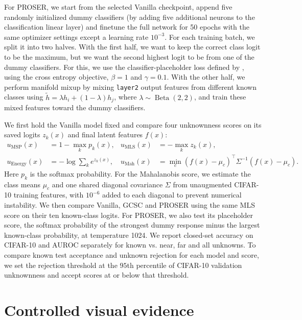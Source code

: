 \documentclass{article}
\begin{document}
For PROSER, we start from the selected Vanilla checkpoint, append five randomly initialized dummy classifiers (by adding five additional neurons to the classification linear layer) and finetune the full network for 50 epochs with the same optimizer settings except a learning rate $10^{-3}$. 
For each training batch, we split it into two halves. With the first half, we want to keep the correct class logit to be the maximum, but we want the second highest logit to be from one of the dummy classifiers. For this, we use the classifier-placeholder loss defined by \citet{zhou2021proser},
using the cross entropy objective, $\beta=1$ and $\gamma=0.1$.
With the other half, we perform manifold mixup by mixing \texttt{layer2} output features from different known classes using $\tilde h=\lambda h_i+(1-\lambda)h_j$, where $\lambda\sim\operatorname{Beta}(2,2)$, and train these mixed features toward the dummy classifiers.

We first hold the Vanilla model fixed and compare four unknownness scores on its saved logits $z_k(x)$ and final latent features $f(x)$:
\[
\begin{aligned}
u_{\mathrm{MSP}}(x)&=1-\max_k p_k(x), &
u_{\mathrm{MLS}}(x)&=-\max_k z_k(x),\\
u_{\mathrm{Energy}}(x)&=-\log\sum_k e^{z_k(x)}, &
u_{\mathrm{Mah}}(x)&=\min_c(f(x)-\mu_c)^\top\Sigma^{-1}(f(x)-\mu_c).
\end{aligned}
\]
Here $p_k$ is the softmax probability. For the Mahalanobis score, we estimate the class means $\mu_c$ and one shared diagonal covariance $\Sigma$ from unaugmented CIFAR-10 training features, with $10^{-6}$ added to each diagonal to prevent numerical instability. We then compare Vanilla, GCSC and PROSER using the same MLS score on their ten known-class logits. For PROSER, we also test its placeholder score, the softmax probability of the strongest dummy response minus the largest known-class probability, at temperature 1024. We report closed-set accuracy on CIFAR-10 and AUROC separately for known vs. near, far and all unknowns. To compare known test acceptance and unknown rejection for each model and score, we set the rejection threshold at the $95$th percentile of CIFAR-10 validation unknownness and accept scores at or below that threshold. 


\section{Controlled visual evidence}
\label{sec:visual}
\end{document}
